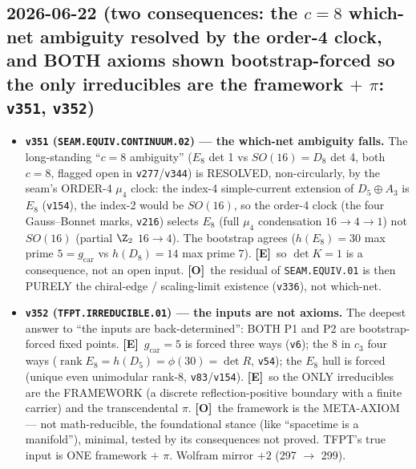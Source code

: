 \documentclass[11pt]{article}
\providecommand{\mE}{\textbf{[E]}}\providecommand{\mC}{\textbf{[C]}}
\providecommand{\mO}{\textbf{[O]}}\providecommand{\mX}{\textbf{[X]}}
\providecommand{\vref}[1]{\texttt{#1}}
\providecommand{\cthree}{c_3}\providecommand{\phiz}{\varphi_0^{\mathrm{ret}}}
\providecommand{\gcar}{g_{\mathrm{car}}}\providecommand{\Nfam}{N_{\mathrm{fam}}}
\begin{document}
\subsection*{2026-06-22 (two consequences: the $c{=}8$ which-net ambiguity resolved by the order-4 clock, and BOTH axioms shown bootstrap-forced so the only irreducibles are the framework $+$ $\pi$: \texttt{v351}, \texttt{v352})}
\begin{itemize}
\item \textbf{\texttt{v351} (\texttt{SEAM.EQUIV.CONTINUUM.02}) --- the which-net ambiguity falls.} The
long-standing ``$c{=}8$ ambiguity'' ($E_8$ det 1 vs $SO(16){=}D_8$ det 4, both $c{=}8$, flagged open in
\vref{v277}/\vref{v344}) is RESOLVED, non-circularly, by the seam's ORDER-4 $\mu_4$ clock: the index-4 simple-current
extension of $D_5\!\oplus\!A_3$ is $E_8$ (\vref{v154}), the index-2 would be $SO(16)$, so the order-4 clock (the
four Gauss--Bonnet marks, \vref{v216}) selects $E_8$ (full $\mu_4$ condensation $16{\to}4{\to}1$) not $SO(16)$
(partial $\Z_2$ $16{\to}4$). The bootstrap agrees ($h(E_8){=}30$ max prime $5{=}\gcar$ vs $h(D_8){=}14$ max prime
$7$). \mE\ so $\det K{=}1$ is a consequence, not an open input. \mO\ the residual of \texttt{SEAM.EQUIV.01} is then
PURELY the chiral-edge / scaling-limit existence (\vref{v336}), not which-net.
\item \textbf{\texttt{v352} (\texttt{TFPT.IRREDUCIBLE.01}) --- the inputs are not axioms.} The deepest answer to
``the inputs are back-determined'': BOTH P1 and P2 are bootstrap-forced fixed points. \mE\ $\gcar{=}5$ is forced
three ways (\vref{v6}); the $8$ in $\cthree$ four ways ($\operatorname{rank}E_8=h(D_5)=\phi(30)=\det R$, \vref{v54});
the $E_8$ hull is forced (unique even unimodular rank-8, \vref{v83}/\vref{v154}). \mE\ so the ONLY irreducibles are
the FRAMEWORK (a discrete reflection-positive boundary with a finite carrier) and the transcendental $\pi$. \mO\ the
framework is the META-AXIOM --- not math-reducible, the foundational stance (like ``spacetime is a manifold''),
minimal, tested by its consequences not proved. TFPT's true input is ONE framework $+$ $\pi$. Wolfram mirror $+2$
(297 $\to$ 299).
\end{itemize}
\end{document}
